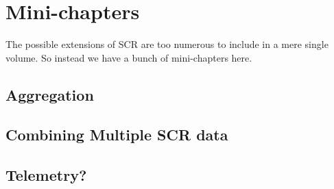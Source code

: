 \chapter{
Mini-chapters
}
\label{chapt.othertopics}


\vspace{.3in}



The possible extensions of SCR are too numerous to include in a mere
single volume.
So instead we have a bunch of mini-chapters here.



\section{Aggregation}


\section{Combining Multiple SCR data}

\section{Telemetry?}


